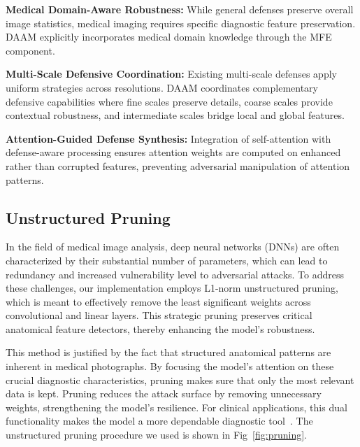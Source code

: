 \documentclass[preprint,12pt]{elsarticle}
\begin{document}
\textbf{Medical Domain-Aware Robustness:} While general defenses preserve overall image statistics, medical imaging requires specific diagnostic feature preservation. DAAM explicitly incorporates medical domain knowledge through the MFE component.

\textbf{Multi-Scale Defensive Coordination:} Existing multi-scale defenses apply uniform strategies across resolutions. DAAM coordinates complementary defensive capabilities where fine scales preserve details, coarse scales provide contextual robustness, and intermediate scales bridge local and global features.

\textbf{Attention-Guided Defense Synthesis:} Integration of self-attention with defense-aware processing ensures attention weights are computed on enhanced rather than corrupted features, preventing adversarial manipulation of attention patterns.

\subsection{Unstructured Pruning}
In the field of medical image analysis, deep neural networks (DNNs) are often characterized by their substantial number of parameters, which can lead to redundancy and increased vulnerability level to adversarial attacks. To address these challenges, our implementation employs L1-norm unstructured pruning, which is meant to effectively remove the least significant weights across convolutional and linear layers. This strategic pruning preserves critical anatomical feature detectors, thereby enhancing the model's robustness.

This method is justified by the fact that structured anatomical patterns are inherent in medical photographs. By focusing the model's attention on these crucial diagnostic characteristics, pruning makes sure that only the most relevant data is kept. Pruning reduces the attack surface by removing unnecessary weights, strengthening the model's resilience. For clinical applications, this dual functionality makes the model a more dependable diagnostic tool~\cite{Liebenwein21}. The unstructured pruning procedure we used is shown in Fig~\ref{fig:pruning}.
\end{document}
